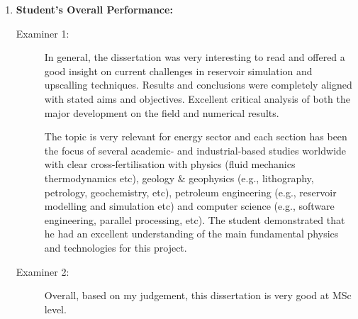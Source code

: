\documentclass[14pt,twoside]{report}
\begin{document}
\begin{enumerate}
%
    \item {\bf Student's Overall Performance:}
        \begin{description}
            \item[Examiner 1:] In general, the dissertation was very interesting to read and offered a good insight on current challenges in reservoir simulation and upscalling techniques. Results and conclusions were completely aligned with stated aims and objectives. Excellent critical analysis of both the major development on the field and numerical results. 

The topic is very relevant for energy sector and each section has been the focus of several academic- and industrial-based studies worldwide with clear cross-fertilisation with physics (fluid mechanics thermodynamics etc), geology $\&$ geophysics (e.g., lithography, petrology, geochemistry, etc), petroleum engineering (e.g., reservoir modelling and simulation etc) and computer science (e.g., software engineering, parallel processing, etc). The student demonstrated that he had an excellent understanding of the main fundamental physics and technologies for this project.
            \item[Examiner 2:] Overall, based on my judgement, this dissertation is very good at MSc level.
        \end{description}
%
\end{enumerate}


\end{document}

